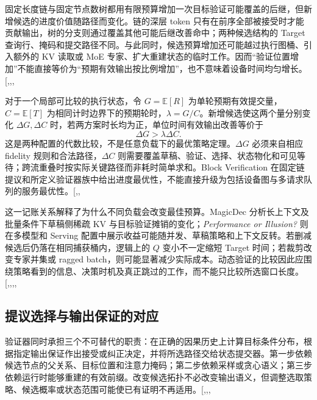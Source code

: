 \documentclass[
  a4paper,
  UTF8,
  fontset=none,
  zihao=5]{ctexart}
\begin{document}
固定长度链与固定节点数树都用有限预算增加一次目标验证可能覆盖的后继，但新增候选的进度价值随路径而变化。链的深层
token
只有在前序全部被接受时才能贡献输出，树的分支则通过覆盖其他可能后继改善命中；两种候选结构的
Target
查询行、掩码和提交路径不同。与此同时，候选预算增加还可能越过执行图桶、引入额外的
KV 读取或 MoE
专家、扩大重建状态的临时工作。因而``验证位置增加''不能直接等价为``预期有效输出按比例增加''，也不意味着设备时间均匀增长。{[},,,\citeproc{ref-moebytes}{54}{]}

对于一个局部可比较的执行状态，令 \(G=\mathbb{E}[R]\)
为单轮预期有效提交量，\(C=\mathbb{E}[T]\)
为相同计时边界下的预期轮时，\(\lambda=G/C\)。新增候选使这两个量分别变化
\(\Delta G,\Delta C\) 时，若两方案时长均为正，单位时间有效输出改善等价于
\[
\Delta G>\lambda\Delta C.
\] 这是两种配置的代数比较，不是任意负载下的最优策略定理。\(\Delta G\)
必须来自相应 fidelity 规则和合法路径，\(\Delta C\)
则需要覆盖草稿、验证、选择、状态物化和可见等待；跨流重叠时按实际关键路径而非耗时简单求和。Block
Verification
在固定链提议和所定义验证器族中给出进度最优性，不能直接升级为包括设备图与多请求队列的服务最优性。{[},,\citeproc{ref-blockverification}{23}{]}

这一记账关系解释了为什么不同负载会改变最佳预算。MagicDec
分析长上下文及批量条件下草稿侧稀疏 KV
与目标验证摊销的变化；\emph{Performance or Illusion?} 则在多模型和
Serving
配置中展示收益可能随并发、草稿策略和上下文反转。若删减候选后仍落在相同捕获桶内，逻辑上的
\(Q\) 变小不一定缩短 Target 时间；若裁剪改变专家并集或 ragged
batch，则可能显著减少实际成本。动态验证的比较因此应围绕策略看到的信息、决策时机及真正跳过的工作，而不能只比较所选窗口长度。{[},,,,\citeproc{ref-tabletune}{53}{]}

\subsection{提议选择与输出保证的对应}\label{verification-contracts}

验证器同时承担三个不可替代的职责：在正确的因果历史上计算目标条件分布，根据指定输出保证作出接受或纠正决定，并将所选路径交给状态提交器。第一步依赖候选节点的父关系、目标位置和注意力掩码；第二步依赖采样或贪心语义；第三步依赖运行时能够重建的有效前缀。改变候选拓扑不必改变输出语义，但调整选取策略、候选概率或状态范围可能使已有证明不再适用。{[},,,\citeproc{ref-spectr}{22}{]}
\end{document}
